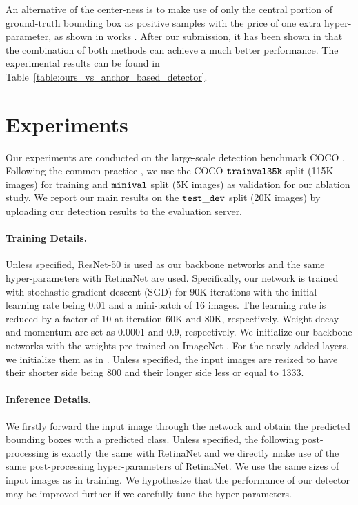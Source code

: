 \documentclass[10pt,twocolumn,letterpaper]{article}
\renewcommand{\texttt}[1]{ $ {{\tt #1} } $}
\newcommand{\1}{{\mathbbm{1}}}           %
\begin{document}
%




%
%
%
%
%
%
%

%
%
%
%
%
%
%
%
%


An alternative of the center-ness is to make use of only the central portion of ground-truth bounding box as positive samples with the price of one extra hyper-parameter, as shown in works \cite{huang2015densebox, zhou2017east}. After our submission, it has been shown in \cite{fcosplus} that the combination of both methods can achieve a much better performance. The experimental results can be found in Table~\ref{table:ours_vs_anchor_based_detector}.

%

%
%
%
%
%

\section{Experiments}
Our experiments are conducted on the large-scale detection benchmark COCO \cite{lin2014microsoft}. Following the common practice \cite{lin2017focal, lin2017feature, ren2015faster}, we use the COCO  \texttt{trainval35k} split (115K images) for training and \texttt{minival} split (5K images) as validation for our ablation study. We report our main results on the \texttt{test\_dev} split (20K images) by uploading our detection results to the evaluation  server.



\paragraph{Training Details.} Unless specified, ResNet-50 \cite{he2016deep} is used as our backbone networks and the same hyper-parameters with RetinaNet \cite{lin2017focal} are used. Specifically, our network is trained with stochastic gradient descent (SGD) for 90K iterations with the initial learning rate being 0.01 and a mini-batch of 16 images. The learning rate is reduced by a factor of 10 at iteration 60K and 80K, respectively. Weight decay and momentum are set as 0.0001 and 0.9, respectively. We initialize our backbone networks with the weights pre-trained on ImageNet \cite{deng2009imagenet}. For the newly added layers, we initialize them as in \cite{lin2017focal}. Unless specified, the input images are resized to have their shorter side being 800 and their longer side less or equal to 1333.

\paragraph{Inference Details.} We firstly forward the input image through the network and obtain the predicted bounding boxes with a predicted class. Unless specified, the following post-processing is exactly the same with RetinaNet \cite{lin2017focal} and we directly make use of the same post-processing hyper-parameters of RetinaNet. 
%
We use the same sizes of input images as in training.
%
We hypothesize  that  the performance of our detector may be 
improved further if we carefully tune the hyper-parameters. 
\end{document}
